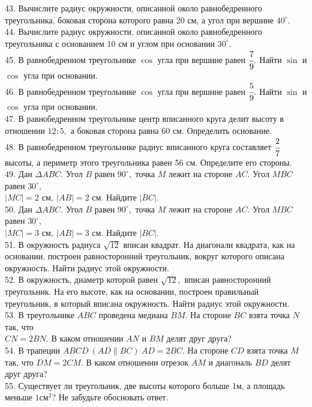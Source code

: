 43. Вычислите радиус окружности, описанной около равнобедренного треугольника, боковая сторона которого равна 20 см, а угол при вершине $40^\circ.$\\
44. Вычислите радиус окружности, описанной около равнобедренного треугольника с основанием 10 см и углом при основании $30^\circ.$\\
45. В равнобедренном треугольнике $\cos$ угла при вершине равен $\cfrac{7}{9}.$ Найти $\sin$ и $\cos$ угла при основании.\\
46. В равнобедренном треугольнике $\cos$ угла при вершине равен $\cfrac{5}{9}.$ Найти $\sin$ и $\cos$ угла при основании.\\
47. В равнобедренном треугольнике центр вписанного круга делит высоту в отношении $12:5,$ а боковая сторона равна 60 см. Определить основание.\\
48. В равнобедренном треугольнике радиус вписанного круга составляет $\cfrac{2}{7}$ высоты, а периметр этого треугольника равен 56 см. Определите его стороны.\\
49. Дан $\Delta ABC.$ Угол $B$ равен $90^\circ,$ точка $M$ лежит на стороне $AC.$ Угол  $MBC$ равен $30^\circ,$\\ $|MC|=2\text{ см},\ |AB|=2\text{ см}.$ Найдите $|BC|.$\\
50. Дан $\Delta ABC.$ Угол $B$ равен $90^\circ,$ точка $M$ лежит на стороне $AC.$ Угол  $MBC$ равен $30^\circ,$\\ $|MC|=3\text{ см},\ |AB|=3\text{ см}.$ Найдите $|BC|.$\\
51. В окружность радиуса $\sqrt{12}$ вписан квадрат. На диагонали квадрата, как на основании, построен равносторонний треугольник, вокруг которого описана окружность. Найти радиус этой окружности.\\
52. В окружность, диаметр которой равен $\sqrt{12},$ вписан равносторонний треугольник. На его высоте, как на основании, построен правильный треугольник, в который вписана окружность. Найти радиус этой окружности.\\
53. В треугольнике $ABC$ проведена медиана $BM.$ На стороне $BC$ взята точка $N$ так, что\\ $CN=2BN.$ В каком отношении $AN$ и $BM$ делят друг друга?\\
54. В трапеции $ABCD\ (AD\parallel BC)\ AD=2BC.$ На стороне $CD$ взята точка $M$ так, что $DM=2CM.$ В каком отношении отрезок $AM$ и диагональ $BD$ делят друг друга?\\
55. Существует ли треугольник, две высоты которого больше 1м, а площадь меньше $1\text{см}^2?$ Не забудьте обосновать ответ.\\
